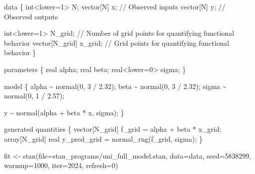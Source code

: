 \documentclass[
  letterpaper,
  DIV=11,
  numbers=noendperiod]{scrartcl}
\newenvironment{Shaded}{\begin{snugshade}}{\end{snugshade}}
\newcommand{\AttributeTok}[1]{\textcolor[rgb]{0.40,0.45,0.13}{#1}}
\newcommand{\CommentTok}[1]{\textcolor[rgb]{0.37,0.37,0.37}{#1}}
\newcommand{\DataTypeTok}[1]{\textcolor[rgb]{0.68,0.00,0.00}{#1}}
\newcommand{\DecValTok}[1]{\textcolor[rgb]{0.68,0.00,0.00}{#1}}
\newcommand{\FloatTok}[1]{\textcolor[rgb]{0.68,0.00,0.00}{#1}}
\newcommand{\FunctionTok}[1]{\textcolor[rgb]{0.28,0.35,0.67}{#1}}
\newcommand{\KeywordTok}[1]{\textcolor[rgb]{0.00,0.23,0.31}{#1}}
\newcommand{\NormalTok}[1]{\textcolor[rgb]{0.00,0.23,0.31}{#1}}
\newcommand{\OtherTok}[1]{\textcolor[rgb]{0.00,0.23,0.31}{#1}}
\newcommand{\StringTok}[1]{\textcolor[rgb]{0.13,0.47,0.30}{#1}}
\begin{document}
\begin{codelisting}

\caption{\texttt{uni\textbackslash\_full\textbackslash\_model.stan}}

\begin{Shaded}
\begin{Highlighting}[]
\KeywordTok{data}\NormalTok{ \{}
  \DataTypeTok{int}\NormalTok{\textless{}}\KeywordTok{lower}\NormalTok{=}\DecValTok{1}\NormalTok{\textgreater{} N;}
  \DataTypeTok{vector}\NormalTok{[N] x; }\CommentTok{// Observed inputs}
  \DataTypeTok{vector}\NormalTok{[N] y; }\CommentTok{// Observed outputs}
  
  \DataTypeTok{int}\NormalTok{\textless{}}\KeywordTok{lower}\NormalTok{=}\DecValTok{1}\NormalTok{\textgreater{} N\_grid; }\CommentTok{// Number of grid points for quantifying functional behavior}
  \DataTypeTok{vector}\NormalTok{[N\_grid] x\_grid; }\CommentTok{// Grid points for quantifying functional behavior}
\NormalTok{\}}

\KeywordTok{parameters}\NormalTok{ \{ }
  \DataTypeTok{real}\NormalTok{ alpha;}
  \DataTypeTok{real}\NormalTok{ beta;}
  \DataTypeTok{real}\NormalTok{\textless{}}\KeywordTok{lower}\NormalTok{=}\DecValTok{0}\NormalTok{\textgreater{} sigma;}
\NormalTok{\}}

\KeywordTok{model}\NormalTok{ \{}
\NormalTok{  alpha \textasciitilde{} normal(}\DecValTok{0}\NormalTok{, }\DecValTok{3}\NormalTok{ / }\FloatTok{2.32}\NormalTok{);}
\NormalTok{  beta \textasciitilde{} normal(}\DecValTok{0}\NormalTok{, }\DecValTok{3}\NormalTok{ / }\FloatTok{2.32}\NormalTok{);}
\NormalTok{  sigma \textasciitilde{} normal(}\DecValTok{0}\NormalTok{, }\DecValTok{1}\NormalTok{ / }\FloatTok{2.57}\NormalTok{);}
  
\NormalTok{  y \textasciitilde{} normal(alpha + beta * x, sigma);}
\NormalTok{\}}

\KeywordTok{generated quantities}\NormalTok{ \{}
  \DataTypeTok{vector}\NormalTok{[N\_grid] f\_grid = alpha + beta * x\_grid;}
  \DataTypeTok{array}\NormalTok{[N\_grid] }\DataTypeTok{real}\NormalTok{ y\_pred\_grid = normal\_rng(f\_grid, sigma);}
\NormalTok{\}}
\end{Highlighting}
\end{Shaded}

\end{codelisting}

\begin{Shaded}
\begin{Highlighting}[]
\NormalTok{fit }\OtherTok{\textless{}{-}} \FunctionTok{stan}\NormalTok{(}\AttributeTok{file=}\StringTok{\textquotesingle{}stan\_programs/uni\_full\_model.stan\textquotesingle{}}\NormalTok{,}
            \AttributeTok{data=}\NormalTok{data, }\AttributeTok{seed=}\DecValTok{5838299}\NormalTok{,}
            \AttributeTok{warmup=}\DecValTok{1000}\NormalTok{, }\AttributeTok{iter=}\DecValTok{2024}\NormalTok{, }\AttributeTok{refresh=}\DecValTok{0}\NormalTok{)}
\end{Highlighting}
\end{Shaded}
\end{document}
